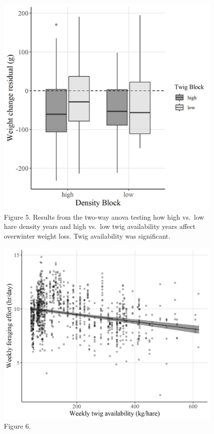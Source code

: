 \documentclass[
]{article}
\begin{document}
\begin{figure}
\centering
\includegraphics{Output/Figures/weight_anova.jpeg}
\caption{Figure 5. Results from the two-way anova testing how high
vs.~low hare density years and high vs.~low twig availability years
affect overwinter weight loss. Twig availability was significant.}
\end{figure}

\begin{figure}
\centering
\includegraphics{Output/Figures/foraging_percap_control.jpeg}
\caption{Figure 6.}
\end{figure}
\end{document}
